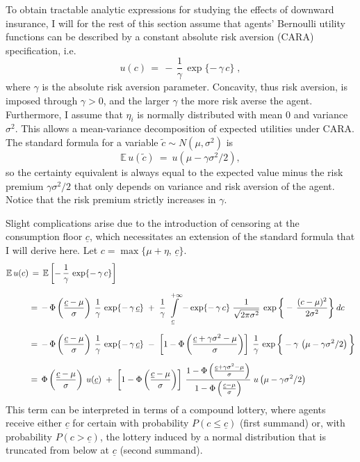 To obtain tractable analytic expressions for studying the effects of downward insurance, I will for the rest of this section assume that agents' Bernoulli utility functions can be described by a constant absolute risk aversion (CARA) specification, i.e.
\begin{equation}
u(c) \, = \,  - \, \frac{1}{\gamma} \, \exp\{- \,  \gamma \, c \} \; ,
\end{equation}
where $\gamma$ is the absolute risk aversion parameter. Concavity, thus risk aversion, is imposed through $\gamma > 0$, and the larger $\gamma$ the more risk averse the agent. Furthermore, I assume that $\eta_i$ is normally distributed with mean $0$ and variance $\sigma^2$. This allows a mean-variance decomposition of expected utilities under CARA. The standard formula for a variable $\tilde{c} \sim N(\mu, \sigma^2)$ is
\begin{equation}
\mathbb{E} \, u(\tilde{c}) \: = \:  u\left(\mu -  \gamma \sigma^2 /2 \right),
\end{equation}
so the certainty equivalent is always equal to the expected value minus the risk premium $\gamma \sigma^2 /2$ that only depends on variance and risk aversion of the agent. Notice that the risk premium strictly increases in $\gamma$.

Slight complications arise due to the introduction of censoring at the consumption floor $\underline{c}$, which necessitates an extension of the standard formula that I will derive here. Let $c = \max\{\mu + \eta, \, \underline{c}\}$.
\begin{align}
\mathbb{E} \,  u(c) & \, = \,  \mathbb{E}\left[- \, \frac{1}{\gamma} \,\exp\{- \,  \gamma \, c  \} \right]  \\[6pt]
& = \, -  \, \Phi\left(\frac{\underline{c} - \mu}{\sigma}\right) \: \frac{1}{\gamma} \,  \exp\{- \,  \gamma \, \underline{c}  \}   \; + \; \frac{1}{\gamma} \, 
\int\displaylimits_{\underline{c}}^{+ \infty} - \exp\{- \,  \gamma \, c  \} \; \frac{1}{\sqrt{2 \pi \sigma^2}} \: \exp\bigg\{- \, \frac{(c - \mu)^2}{2 \sigma^2} \bigg\} \: dc \\[6pt]
& = \, -  \, \Phi\left(\frac{\underline{c} - \mu}{\sigma}\right) \: \frac{1}{\gamma} \, \exp\{- \,  \gamma \, \underline{c}  \}   \; -  \; 
 \left[1 - \Phi\left(\frac{\underline{c} + \gamma \sigma^2 - \mu}{\sigma}\right) \right] \;  \frac{1}{\gamma} \, \exp\bigg\{- \gamma \, \left(\mu -  \gamma \sigma^2 /2 \right) \bigg\} \\[6pt]
& = \, \Phi\left(\frac{\underline{c} - \mu}{\sigma}\right) \: u(\underline{c})   \; +  \; \left[1 - \Phi\left(\frac{\underline{c} - \mu}{\sigma}\right) \right] \: \frac{1 - \Phi\left(\frac{\underline{c} + \gamma \sigma^2 - \mu}{\sigma}\right)}{1 - \Phi\left(\frac{\underline{c} - \mu}{\sigma}\right)} \; u\left(\mu -  \gamma \sigma^2 /2 \right)
\end{align}
This term can be interpreted in terms of a compound lottery, where agents receive either $\underline{c}$ for certain with probability $P(c \leq \underline{c})$ (first summand) or, with probability $P(c > \underline{c})$, the lottery induced by a normal distribution that is truncated from below at $\underline{c}$ (second summand). 



